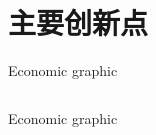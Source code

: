 \documentclass[xcolor=table,mathserif]{beamer}
\begin{document}
\section{主要创新点}
\begin{frame}{Economic graphic}
    \begin{columns}
        \begin{column}{0.5\textwidth}
            
        \end{column}
        \begin{column}{0.5\textwidth}
            
        \end{column}
    \end{columns}
\end{frame}

\begin{frame}{Economic graphic}
    
\end{frame}
\end{document}
